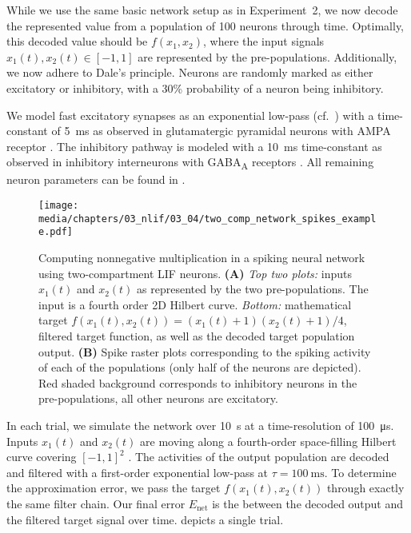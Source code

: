 While we use the same basic network setup as in Experiment~2, we now decode the represented value from a population of \num{100} neurons through time.
Optimally, this decoded value should be $f(x_1, x_2)$, where the input signals $x_1(t), x_2(t) \in [-1, 1]$ are represented by the pre-populations.
Additionally, we now adhere to Dale's principle.
Neurons are randomly marked as either excitatory or inhibitory, with a 30\% probability of a neuron being inhibitory.

We model fast excitatory synapses as an exponential low-pass (cf.~) with a time-constant of \SI{5}{\milli\second} as observed in glutamatergic pyramidal neurons with AMPA receptor \citep{jonas1993quantal}.
The inhibitory pathway is modeled with a \SI{10}{\milli\second} time-constant as observed in inhibitory interneurons with GABA\textsubscript{A} receptors \citep{gupta2000organizing}.
All remaining neuron parameters can be found in .


\begin{figure}
	\texttt{[image: media/chapters/03\_nlif/03\_04/two\_comp\_network\_spikes\_example.pdf]}
	\caption[Computing nonnegative multiplication in a spiking neural network using two-compartment LIF neurons]{Computing nonnegative multiplication in a spiking neural network using two-compartment LIF neurons.
	\textbf{(A)} \emph{Top two plots:} inputs $x_1(t)$ and $x_2(t)$ as represented by the two pre-populations. The input is a fourth order 2D Hilbert curve. \emph{Bottom:} mathematical target $f(x_1(t), x_2(t)) = (x_1(t) + 1) (x_2(t) + 1) / 4$, filtered target function, as well as the decoded target population output.
	\textbf{(B)} Spike raster plots corresponding to the spiking activity of each of the populations (only half of the neurons are depicted). Red shaded background corresponds to inhibitory neurons in the pre-populations, all other neurons are excitatory.}
	\label{fig:two_comp_lif_spiking_example}
\end{figure}

In each trial, we simulate the network over \SI{10}{\second} at a time-resolution of \SI{100}{\micro\second}.
Inputs $x_1(t)$ and $x_2(t)$ are moving along a fourth-order space-filling Hilbert curve covering $[-1, 1]^2$ \citep{hilbert1891uber}.
The activities of the output population are decoded and filtered with a first-order exponential low-pass at $\tau = \SI{100}{\milli\second}$.
To determine the approximation error, we pass the target $f(x_1(t), x_2(t))$ through exactly the same filter chain.
Our final error $E_\mathrm{net}$ is the \NRMSE between the decoded output and the filtered target signal over time.
 depicts a single trial.

